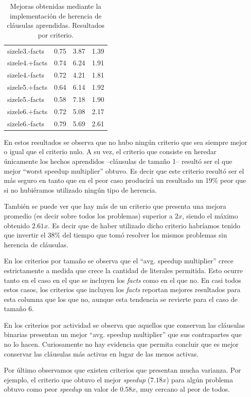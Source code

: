 \begin{table}
\begin{tabular}{lrrr}
		sizele3.-facts	&	0.75	&	3.87	&	1.39 \\
		sizele4.+facts	&	0.74	&	6.24	&	1.91 \\
		sizele4.-facts	&	0.72	&	4.21	&	1.81 \\
		sizele5.+facts	&	0.64	&	6.14	&	1.92 \\
		sizele5.-facts	&	0.58	&	\cellcolor{green}7.18	&	1.90 \\
		sizele6.+facts	&	0.72	&	5.08	&	2.17 \\
		sizele6.-facts	&	0.79	&	5.69	&	\cellcolor{green}2.61 \\
		\bottomrule
	\end{tabular}
	\caption{Mejoras obtenidas mediante la implementación de herencia de cláusulas aprendidas. Resultados por criterio.}
	\label{tab:rescriterios}
\end{table}

En estos resultados se observa que no hubo ningún criterio que sea siempre
mejor o igual que el criterio nulo. A su vez, el criterio que consiste en
heredar únicamente los hechos aprendidos --cláusulas de tamaño 1-- resultó ser
el que mejor ``worst speedup multiplier'' obtuvo. Es decir que este criterio
resultó ser el más seguro en tanto que en el peor caso producirá un resultado
un 19\% peor que si no hubiéramos utilizado ningún tipo de herencia.

También se puede ver que hay más de un criterio que presenta una mejora
promedio (es decir sobre todos los problemas) superior a $2x$, siendo el máximo
obtenido $2.61x$. Es decir que de haber utilizado dicho criterio habríamos
tenido que invertir el 38\% del tiempo que tomó resolver los mismos problemas
sin herencia de cláusulas.

En los criterios por tamaño se observa que el ``avg. speedup multiplier''
crece estrictamente a medida que crece la cantidad de literales permitida.
Esto ocurre tanto en el caso en el que se incluyen los \emph{facts} como en el
que no. En casi todos estos casos, los criterios que incluyen los \emph{facts}
reportan mejores resultados para esta columna que los que no, aunque esta
tendencia se revierte para el caso de tamaño 6.

En los criterios por actividad se observa que aquellos que conservan las
cláusulas binarias presentan un mejor ``avg. speedup multiplier'' que sus
contrapartes que no lo hacen. Curiosamente no hay evidencia que permita
concluir que es mejor conservar las cláusulas más activas en lugar de las
menos activas.

Por último observamos que existen criterios que presentan mucha varianza. Por
ejemplo, el criterio que obtuvo el mejor \emph{speedup} ($7.18x$) para algún
problema obtuvo como peor \emph{speedup} un valor de $0.58x$, muy cercano al
peor de todos.

